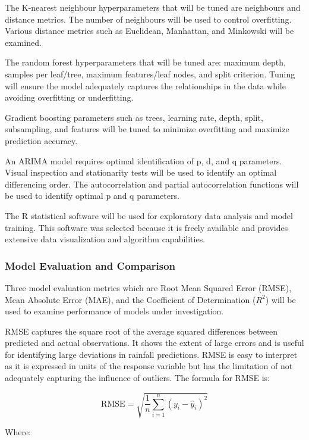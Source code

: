 \documentclass{article}
\begin{document}
The K-nearest neighbour hyperparameters that will be tuned are neighbours and distance
metrics. The number of neighbours will be used to control overfitting. Various distance metrics
such as Euclidean, Manhattan, and Minkowski will be examined.

The random forest hyperparameters that will be tuned are: maximum depth, samples per
leaf/tree, maximum features/leaf nodes, and split criterion. Tuning will ensure the model
adequately captures the relationships in the data while avoiding overfitting or underfitting.

Gradient boosting parameters such as trees, learning rate, depth, split, subsampling, and
features will be tuned to minimize overfitting and maximize prediction accuracy.

An ARIMA model requires optimal identification of p, d, and q parameters. Visual inspection
and stationarity tests will be used to identify an optimal differencing order. The autocorrelation
and partial autocorrelation functions will be used to identify optimal p and q parameters.

The R statistical software will be used for exploratory data analysis and model training. This
software was selected because it is freely available and provides extensive data visualization
and algorithm capabilities.

\subsubsection{Model Evaluation and Comparison}

Three model evaluation metrics which are Root Mean Squared Error (RMSE), Mean Absolute
Error (MAE), and the Coefficient of Determination ($R^2$) will be used to examine performance
of models under investigation.

RMSE captures the square root of the average squared differences between predicted and actual
observations. It shows the extent of large errors and is useful for identifying large deviations
in rainfall predictions. RMSE is easy to interpret as it is expressed in units of the response
variable but has the limitation of not adequately capturing the influence of outliers. The formula
for RMSE is:

\begin{equation*}
\text{RMSE} = \sqrt{\frac{1}{n}\sum_{i=1}^{n}(y_i - \hat{y}_i)^2}
\end{equation*}

Where:
\end{document}
